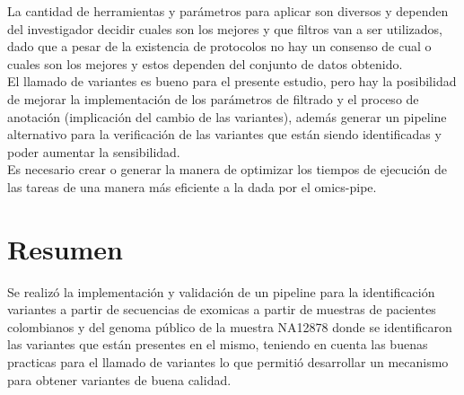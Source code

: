 La cantidad de herramientas y parámetros para aplicar son diversos y dependen del investigador decidir cuales son los mejores y que filtros van a ser utilizados, dado que a pesar de la existencia de protocolos no hay un consenso de cual o cuales son los mejores y estos dependen del conjunto de datos obtenido. \\ 

El llamado de variantes es bueno para el presente estudio, pero hay la posibilidad de mejorar la implementación de los parámetros de filtrado y el proceso de anotación (implicación del cambio de las variantes), además generar un pipeline alternativo para la verificación de las variantes que están siendo identificadas y poder aumentar la sensibilidad. \\

Es necesario crear o generar la manera de optimizar los tiempos de ejecución de las tareas de una manera más eficiente a la dada por el omics-pipe. 

\section*{Resumen}

Se realizó la implementación y validación de un pipeline para la identificación variantes a partir de secuencias de exomicas a partir de muestras de pacientes colombianos y del genoma público de la muestra NA12878 donde se identificaron las variantes que están presentes en el mismo, teniendo en cuenta las buenas practicas para el llamado de variantes lo que permitió desarrollar un mecanismo para obtener variantes de buena calidad. 